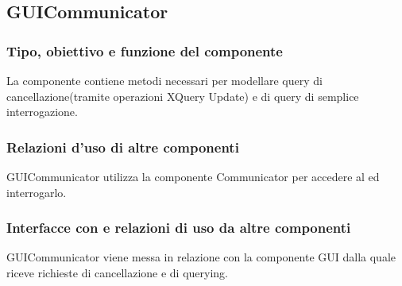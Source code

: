 \documentclass[11pt,titlepage,a4paper]{report}
\begin{document}
\subsection{GUICommunicator}
\subsubsection{Tipo, obiettivo e funzione del componente}
La componente contiene metodi necessari per modellare query di cancellazione(tramite operazioni XQuery Update) e di query di semplice interrogazione.
\subsubsection{Relazioni d'uso di altre componenti}
GUICommunicator utilizza la componente Communicator per accedere al \re ed interrogarlo.
\subsubsection{Interfacce con e relazioni di uso da altre componenti}
GUICommunicator viene messa in relazione con la componente GUI dalla quale riceve richieste di cancellazione e di querying.%
\end{document}
